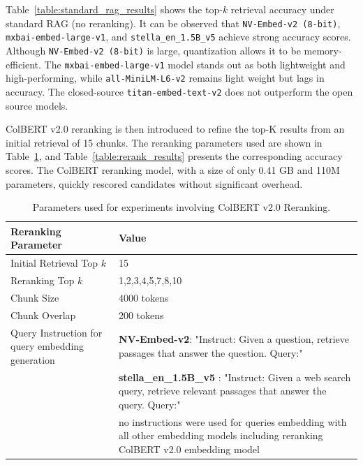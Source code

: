 \documentclass[pdflatex,sn-mathphys-num]{sn-jnl}%
\theoremstyle{thmstyleone}%
\theoremstyle{thmstyletwo}%
\theoremstyle{thmstylethree}%
\begin{document}
Table~\ref{table:standard_rag_results} shows the top-$k$ retrieval accuracy under standard RAG (no reranking). It can be observed that \texttt{NV-Embed-v2 (8-bit)}, \texttt{mxbai-embed-large-v1}, and \texttt{stella\_en\_1.5B\_v5} achieve strong accuracy scores. Although \texttt{NV-Embed-v2 (8-bit)} is large, quantization allows it to be memory-efficient. The \texttt{mxbai-embed-large-v1} model stands out as both lightweight and high-performing, while \texttt{all-MiniLM-L6-v2} remains light weight but lags in accuracy. The closed-source \texttt{titan-embed-text-v2} does not outperform the open source models.



ColBERT v2.0 reranking is then introduced to refine the top-K results from an initial retrieval of 15 chunks. The reranking parameters used are shown in Table~\ref{table:rerank_params}, and Table~\ref{table:rerank_results} presents the corresponding accuracy scores. The ColBERT reranking model, with a size of only 0.41 GB and 110M parameters, quickly rescored candidates without significant overhead.

\begin{table}[h]
\centering
\begin{tabular}{|p{4cm}|p{8cm}|}
\hline
\textbf{Reranking Parameter} & \textbf{Value} \\
\hline
Initial Retrieval Top $k$ & 15 \\
Reranking Top $k$ & 1,2,3,4,5,7,8,10 \\
Chunk Size & 4000 tokens \\
Chunk Overlap & 200 tokens \\
Query Instruction for query embedding generation & \textbf{NV-Embed-v2}: "Instruct: Given a question, retrieve passages that answer the question. Query:" \\ 
~ & \textbf{stella\_en\_1.5B\_v5 }: "Instruct: Given a web search query, retrieve relevant passages that answer the query. Query:" \\
~ & no instructions were used for queries embedding with all other embedding models including reranking ColBERT v2.0 embedding model \\
\hline
\end{tabular}
\caption{Parameters used for experiments involving ColBERT v2.0 Reranking.}
\label{table:rerank_params}
\end{table}
\end{document}
